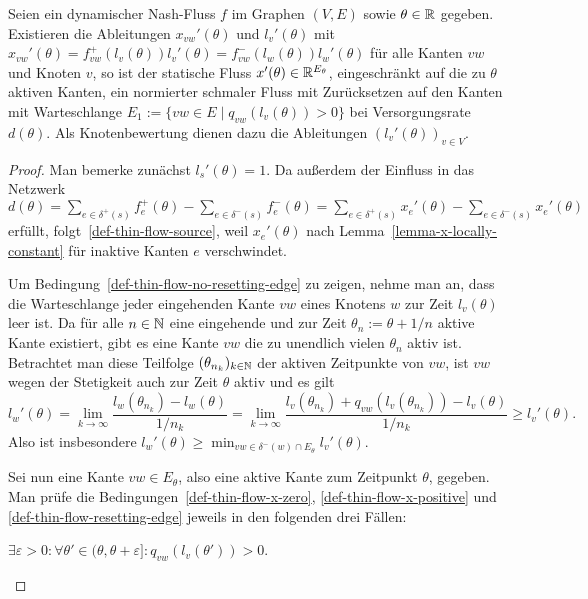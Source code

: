 \begin{theorem}
	Seien ein dynamischer Nash-Fluss $f$ im Graphen $(V,E)$ sowie $\theta\in\mathbb{R}$ gegeben.
	Existieren die Ableitungen $x_{vw}'(\theta)$ und $l_v'(\theta)$ mit $x_{vw}'(\theta) = f_{vw}^+(l_v(\theta)) l_v'(\theta)= f_{vw}^-(l_w(\theta))l_w'(\theta)$ für alle Kanten $vw$ und Knoten $v$, so ist der statische Fluss $x'(\theta) \in \mathbb{R}^{E_\theta}$, eingeschränkt auf die zu $\theta$ aktiven Kanten, ein normierter schmaler Fluss mit Zurücksetzen auf den Kanten mit Warteschlange $E_1:=\{vw\in E \mid q_{vw}(l_v(\theta))>0 \}$ bei Versorgungsrate $d(\theta)$.
	Als Knotenbewertung dienen dazu die Ableitungen $(l_v'(\theta))_{v\in V}$.
\end{theorem}
\begin{proof}
	Man bemerke zunächst $l_s'(\theta) = 1$.
	Da außerdem der Einfluss in das Netzwerk $d(\theta)=  \sum_{e\in \delta^+(s)} f_e^+(\theta) - \sum_{e\in\delta^-(s)} f_e^-(\theta) = \sum_{e\in \delta^+(s)} x_e'(\theta) - \sum_{e\in\delta^-(s)} x_e'(\theta)$ erfüllt, folgt~\ref{def-thin-flow-source}, weil $x_e'(\theta)$ nach Lemma~\ref{lemma-x-locally-constant} für inaktive Kanten $e$ verschwindet.
	
	Um Bedingung~\ref{def-thin-flow-no-resetting-edge} zu zeigen,
	nehme man an, dass die Warteschlange jeder eingehenden Kante $vw$ eines Knotens $w$ zur Zeit $l_v(\theta)$ leer ist.
	Da für alle $n\in\mathbb{N}$ eine eingehende und zur Zeit $\theta_n := \theta + 1/n$ aktive Kante existiert, gibt es eine Kante $vw$ die zu unendlich vielen $\theta_n$ aktiv ist.
	Betrachtet man diese Teilfolge $(\theta_{n_k})_{k\in\mathbb{N}}$ der aktiven Zeitpunkte von $vw$, ist $vw$ wegen der Stetigkeit auch zur Zeit $\theta$ aktiv und es gilt 
	\[
	l_w'(\theta) = \lim_{k\to\infty} \frac{l_w(\theta_{n_k})- l_w(\theta)}{1/n_k} = \lim_{k\to\infty} \frac{ l_v(\theta_{n_k}) + q_{vw}(l_v(\theta_{n_k})) - l_v(\theta) }{1/n_k} \geq l_v'(\theta).
	\]
	Also ist insbesondere $l_w'(\theta) \geq \min_{vw\in \delta^-(w)\cap E_\theta} l_v'(\theta)$.
	
	Sei nun eine Kante $vw\in E_\theta$, also eine aktive Kante zum Zeitpunkt $\theta$, gegeben. Man prüfe die Bedingungen~\ref{def-thin-flow-x-zero}, \ref{def-thin-flow-x-positive} und \ref{def-thin-flow-resetting-edge} jeweils in den folgenden drei Fällen:
	
	\begin{description}[leftmargin=0cm, topsep=0cm, itemindent=0.5cm]
		\item[1. Fall:] $\exists \varepsilon > 0:\forall \theta'\in (\theta, \theta + \varepsilon ] : q_{vw}(l_v(\theta')) > 0$.
		

\end{description}
\end{proof}

